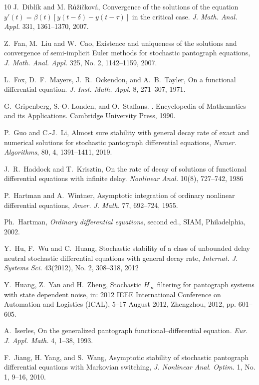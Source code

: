 \documentclass[a4paper,10pt,reqno]{amsart}
\numberwithin{equation}{section}
\theoremstyle{definition}
\theoremstyle{remark}
\DeclareMathOperator{\1}{\mathbbm 1}
\begin{document}
\begin{thebibliography}{10}
J.~Dibl\'ik and M. R\r{u}\v{z}i\v{c}kov\'a, Convergence of the solutions of the equation $y'(t) = \beta(t)[y(t -\delta)- y(t -\tau)]$
in the critical case. {\em J. Math. Anal. Appl.} 331, 1361--1370, 2007.

Z.~Fan, M.~Liu and W.~Cao, Existence and uniqueness of the solutions and convergence
of semi-implicit Euler methods for stochastic pantograph equations, {\em J. Math. Anal. Appl.} 325, No. 2, 1142--1159, 2007.  

L.~Fox, D.~F.~Mayers, J.~R.~Ockendon, and A.~B.~Tayler, On a functional differential equation. {\em J. Inst. Math. Appl.} 8, 271--307, 1971.

G.~Gripenberg, S.-O. Londen, and O.~Staffans.
.
\newblock Encyclopedia of Mathematics and its Applications. Cambridge University Press, 1990.

P.~Guo and C.-J.~Li, Almost sure stability with general decay rate of exact and
numerical solutions for stochastic pantograph differential
equations, {\em Numer. Algorithms}, 80, 4, 1391--1411, 2019.

J.~R.~Haddock and T.~Krisztin, On the rate of decay of solutions of functional differential equations with infinite delay. {\em Nonlinear Anal.} 10(8), 727--742, 1986

P.~Hartman and A.~Wintner,  Asymptotic integration of ordinary nonlinear differential equations, {\em Amer. J. Math.} 77, 692--724, 1955.

 Ph.~Hartman, {\em Ordinary differential equations}, second ed., SIAM, Philadelphia, 2002.

Y.~Hu, F.~Wu and C.~Huang, Stochastic stability of a class of unbounded delay neutral stochastic differential equations with general decay rate, {\em Internat. J. Systems Sci.} 43(2012), No. 2, 308--318, 2012

Y.~Huang, Z.~Yan and H.~Zheng, Stochastic $H_\infty$ filtering for pantograph systems with state dependent noise, in: 2012 IEEE International Conference on Automation and Logistics (ICAL),
5–17 August 2012, Zhengzhou, 2012, pp. 601--605.

A.~Iserles, On the generalized pantograph functional--differential equation. 
{\em Eur. J. Appl. Math.} 4, 1--38, 1993.

F.~Jiang, H. Yang, and S.~Wang, Asymptotic stability of stochastic pantograph differential equations with Markovian switching, {\em J. Nonlinear Anal. Optim.} 1, No. 1, 9--16, 2010.


\end{thebibliography}
\end{document}
